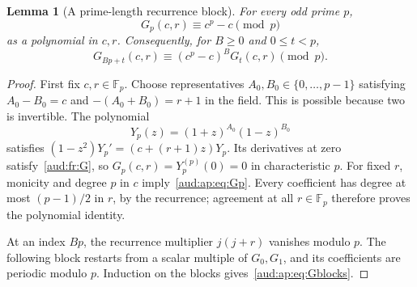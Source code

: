 \documentclass[11pt,a4paper]{article}
\numberwithin{equation}{section}
\newtheorem{lemma}[theorem]{Lemma}
\begin{document}
\begin{lemma}[A prime-length recurrence block]\label{aud:ap:lem:Gp}
For every odd prime $p$,
\begin{equation}\label{aud:ap:eq:Gp}
 G_p(c,r)\equiv c^p-c\pmod p
\end{equation}
as a polynomial in $c,r$. Consequently, for $B\ge0$ and $0\le t<p$,
\begin{equation}\label{aud:ap:eq:Gblocks}
 G_{Bp+t}(c,r)\equiv(c^p-c)^B G_t(c,r)\pmod p.
\end{equation}
\end{lemma}
\begin{proof}
First fix $c,r\in\mathbb F_p$. Choose representatives $A_0,B_0\in\{0,\ldots,p-1\}$ satisfying $A_0-B_0=c$ and $-(A_0+B_0)=r+1$ in the field. This is possible because two is invertible. The polynomial
\[
 Y_p(z)=(1+z)^{A_0}(1-z)^{B_0}
\]
satisfies $(1-z^2)Y_p'=(c+(r+1)z)Y_p$. Its derivatives at zero satisfy~\eqref{aud:fr:G}, so $G_p(c,r)=Y_p^{(p)}(0)=0$ in characteristic $p$. For fixed $r$, monicity and degree $p$ in $c$ imply~\eqref{aud:ap:eq:Gp}. Every coefficient has degree at most $(p-1)/2$ in $r$, by the recurrence; agreement at all $r\in\mathbb F_p$ therefore proves the polynomial identity.

At an index $Bp$, the recurrence multiplier $j(j+r)$ vanishes modulo $p$. The following block restarts from a scalar multiple of $G_0,G_1$, and its coefficients are periodic modulo $p$. Induction on the blocks gives~\eqref{aud:ap:eq:Gblocks}.
\end{proof}
\end{document}
